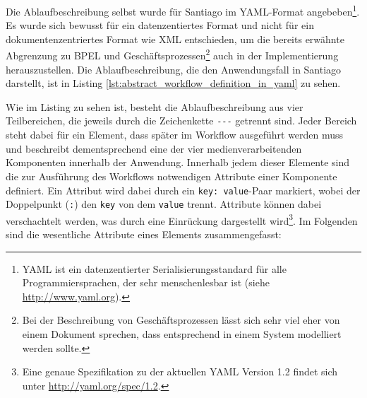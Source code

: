   Die Ablaufbeschreibung selbst wurde für Santiago im YAML-Format angebeben\footnote{YAML ist ein datenzentierter Serialisierungsstandard für alle Programmiersprachen, der sehr menschenlesbar ist (siehe \url{http://www.yaml.org}).}. Es wurde sich bewusst für ein datenzentiertes Format und nicht für ein dokumentenzentriertes Format wie XML entschieden, um die bereits erwähnte Abgrenzung zu BPEL und Geschäftsprozessen\footnote{Bei der Beschreibung von Geschäftsprozessen lässt sich sehr viel eher von einem Dokument sprechen, dass entsprechend in einem System modelliert werden sollte.} auch in der Implementierung herauszustellen. Die Ablaufbeschreibung, die den Anwendungsfall in Santiago darstellt, ist in Listing \ref{lst:abstract_workflow_definition_in_yaml} zu sehen.



  Wie im Listing zu sehen ist, besteht die Ablaufbeschreibung aus vier Teilbereichen, die jeweils durch die Zeichenkette \verb!---! getrennt sind. Jeder Bereich steht dabei für ein Element, dass später im Workflow ausgeführt werden muss und beschreibt dementsprechend eine der vier medienverarbeitenden Komponenten innerhalb der Anwendung. Innerhalb jedem dieser Elemente sind die zur Ausführung des Workflows notwendigen Attribute einer Komponente definiert. Ein Attribut wird dabei durch ein \verb!key: value!-Paar markiert, wobei der Doppelpunkt (\verb!:!) den \verb!key! von dem \verb!value! trennt. Attribute können dabei verschachtelt werden, was durch eine Einrückung dargestellt wird\footnote{Eine genaue Spezifikation zu der aktuellen YAML Version 1.2 findet sich unter \url{http://yaml.org/spec/1.2}.}. Im Folgenden sind die wesentliche Attribute eines Elements zusammengefasst:
  
  \pagebreak
  
